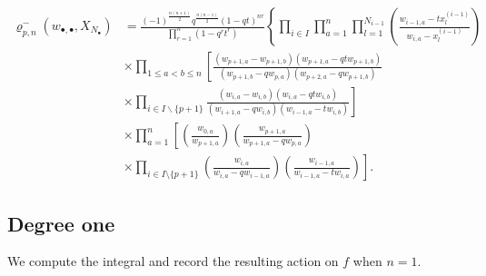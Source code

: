 \documentclass{amsart}
\theoremstyle{remark}
\numberwithin{thm}{section}
\numberwithin{equation}{section}
\begin{document}
\begin{align*}
\varrho_{p,n}^-(w_{\bullet,\bullet},X_{N_\bullet})
&= \frac{(-1)^{\frac{n(n+1)}{2}}q^{\frac{n(n-1)}{2}}\left(1- qt \right)^{nr}}{\prod_{r=1}^n\left(1- q^{r}t^{r} \right)}
\left\{\prod_{i\in I}\prod_{a=1}^n\prod_{l=1}^{N_{i-1}}\left(\frac{  w_{i-1,a}-tx_{l}^{(i-1)} }{ w_{i,a}-x_{l}^{(i-1)} }\right)\right.\\
&\times\prod_{1\le a<b\le n}\left[
\frac{\left(w_{p+1,a}-w_{p+1,b}\right)\left(w_{p+1,a}-qtw_{p+1,b}\right)}{\left(w_{p+1,b}-qw_{p,a}\right)\left(w_{p+2,a}-qw_{p+1,b}\right)}\right.\\
&\times\left.
\prod_{i\in I\backslash\{p+1\}}
\frac{\left(w_{i,a}-w_{i,b}\right)\left(w_{i,a}-qtw_{i,b}\right)}{\left(w_{i+1,a}-qw_{i,b}\right)\left(w_{i-1,a}-tw_{i,b}\right)}\right]\\
&\times \prod_{a=1}^n
\left[
\left(\frac{w_{0,a}}{w_{p+1,a}}\right)
\left(\frac{w_{p+1,a}}{w_{p+1,a}-qw_{p,a}}\right)\right.\\
&\left.\times\prod_{i\in I\setminus\{p+1\}}
 \left(\frac{w_{i,a}}{w_{i,a}-qw_{i-1,a}}\right)\left(\frac{w_{i-1,a}}{w_{i-1,a}-tw_{i,a}}\right) \right].
\end{align*}
\subsection{Degree one}
We compute the integral and record the resulting action on $f$ when $n=1$.
\end{document}
